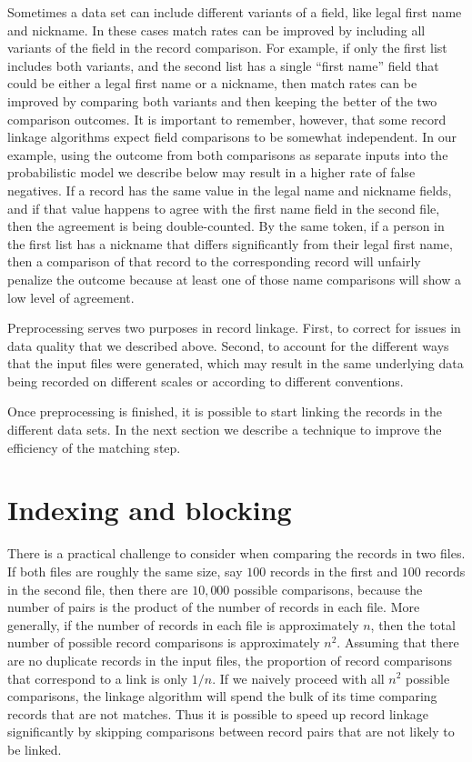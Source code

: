 \documentclass[]{krantz}
\begin{document}
Sometimes a data set can include different variants of a field, like
legal first name and nickname. In these cases match rates can be
improved by including all variants of the field in the record
comparison. For example, if only the first list includes both variants,
and the second list has a single ``first name'' field that could be
either a legal first name or a nickname, then match rates can be
improved by comparing both variants and then keeping the better of the
two comparison outcomes. It is important to remember, however, that some
record linkage algorithms expect field comparisons to be somewhat
independent. In our example, using the outcome from both comparisons as
separate inputs into the probabilistic model we describe below may
result in a higher rate of false negatives. If a record has the same
value in the legal name and nickname fields, and if that value happens
to agree with the first name field in the second file, then the
agreement is being double-counted. By the same token, if a person in the
first list has a nickname that differs significantly from their legal
first name, then a comparison of that record to the corresponding record
will unfairly penalize the outcome because at least one of those name
comparisons will show a low level of agreement.

Preprocessing serves two purposes in record linkage. First, to correct
for issues in data quality that we described above. Second, to account
for the different ways that the input files were generated, which may
result in the same underlying data being recorded on different scales or
according to different conventions.

Once preprocessing is finished, it is possible to start linking the
records in the different data sets. In the next section we describe a
technique to improve the efficiency of the matching step.

\hypertarget{S:indexing}{\section{Indexing and
blocking}\label{S:indexing}}

There is a practical challenge to consider when comparing the records in
two files. If both files are roughly the same size, say \(100\) records
in the first and \(100\) records in the second file, then there are
\(10{,}000\) possible comparisons, because the number of pairs is the
product of the number of records in each file. More generally, if the
number of records in each file is approximately \(n\), then the total
number of possible record comparisons is approximately \(n^2\). Assuming
that there are no duplicate records in the input files, the proportion
of record comparisons that correspond to a link is only \(1/n\). If we
naively proceed with all \(n^2\) possible comparisons, the linkage
algorithm will spend the bulk of its time comparing records that are not
matches. Thus it is possible to speed up record linkage significantly by
skipping comparisons between record pairs that are not likely to be
linked.
\end{document}
